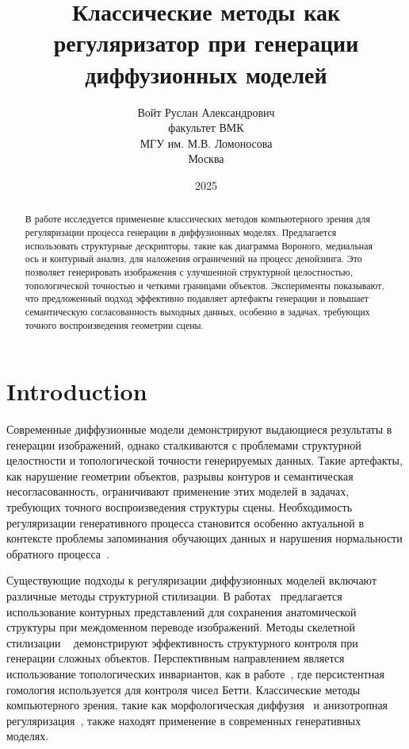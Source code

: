 \documentclass{article}
\title{	Классические методы как регуляризатор при генерации диффузионных моделей }
\author{ Войт Руслан Александрович \\
	факультет ВМК\\
	МГУ им. М.В. Ломоносова\\
	Москва \\
}
\date{2025}
\begin{document}
\maketitle

\begin{abstract}
	В работе исследуется применение классических методов компьютерного зрения для регуляризации процесса генерации в диффузионных моделях. Предлагается использовать структурные дескрипторы, такие как диаграмма Вороного, медиальная ось и контурный анализ, для наложения ограничений на процесс денойзинга. Это позволяет генерировать изображения с улучшенной структурной целостностью, топологической точностью и четкими границами объектов. Эксперименты показывают, что предложенный подход эффективно подавляет артефакты генерации и повышает семантическую согласованность выходных данных, особенно в задачах, требующих точного воспроизведения геометрии сцены.
\end{abstract}



\section{Introduction}

Современные диффузионные модели демонстрируют выдающиеся результаты в генерации изображений, однако сталкиваются с проблемами структурной целостности и топологической точности генерируемых данных. Такие артефакты, как нарушение геометрии объектов, разрывы контуров и семантическая несогласованность, ограничивают применение этих моделей в задачах, требующих точного воспроизведения структуры сцены. Необходимость регуляризации генеративного процесса становится особенно актуальной в контексте проблемы запоминания обучающих данных и нарушения нормальности обратного процесса~\cite{baptista2025memorizationregularizationgenerativediffusion, falck2025fourierspaceperspectivediffusion}.

Существующие подходы к регуляризации диффузионных моделей включают различные методы структурной стилизации. В работах~\cite{chen2024contourdiffunpairedimagetoimagetranslation, pobitzer2024outlineguidedobjectinpaintingdiffusion} предлагается использование контурных представлений для сохранения анатомической структуры при междоменном переводе изображений. Методы скелетной стилизации ~\cite{ju2023humansdnativeskeletonguideddiffusion, zhu2023diffusionmodeleventskeleton} демонстрируют эффективность структурного контроля при генерации сложных объектов. Перспективным направлением является использование топологических инвариантов, как в работе~\cite{gupta2024topodiffusionnet}, где персистентная гомология используется для контроля чисел Бетти. Классические методы компьютерного зрения, такие как морфологическая диффузия~\cite{angulo2011generalisedmorphologicalimagediffusion} и анизотропная регуляризация~\cite{Pace2013-da}, также находят применение в современных генеративных моделях.
\end{document}
